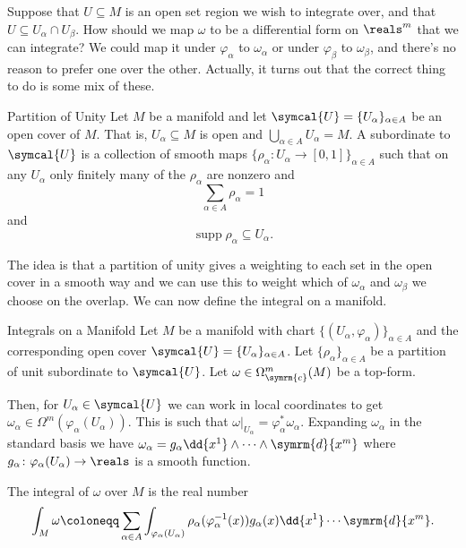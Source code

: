 \documentclass[fleqn]{NotesClass}
\renewcommand{\dl}{\symrm{d}}
\newcommand{\compact}{\symrm{c}}
\newcommand{\openCover}{\symcal{U}}
\DeclareMathOperator{\supp}{supp}
\begin{document}
    Suppose that \(U \subseteq M\) is an open set region we wish to integrate over, and that \(U \subseteq U_\alpha \cap U_\beta\).
    How should we map \(\omega\) to be a differential form on \(\reals^m\) that we can integrate?
    We could map it under \(\varphi_\alpha\) to \(\omega_\alpha\) or under \(\varphi_\beta\) to \(\omega_\beta\), and there's no reason to prefer one over the other.
    Actually, it turns out that the correct thing to do is some mix of these.
    
    \begin{dfn}{Partition of Unity}{}
        Let \(M\) be a manifold and let \(\openCover = \{U_\alpha\}_{\alpha \in A}\) be an open cover of \(M\).
        That is, \(U_\alpha \subseteq M\) is open and \(\bigcup_{\alpha \in A} U_\alpha = M\).
        A  subordinate to \(\openCover\) is a collection of smooth maps \(\{\rho_\alpha \colon U_\alpha \to [0, 1]\}_{\alpha \in A}\) such that on any \(U_\alpha\) only finitely many of the \(\rho_\alpha\) are nonzero and
        \begin{equation}
            \sum_{\alpha \in A} \rho_\alpha = 1
        \end{equation}
        and
        \begin{equation}
            \supp \rho_\alpha \subseteq U_\alpha.
        \end{equation}
    \end{dfn}
    
    The idea is that a partition of unity gives a weighting to each set in the open cover in a smooth way and we can use this to weight which of \(\omega_\alpha\) and \(\omega_\beta\) we choose on the overlap.
    We can now define the integral on a manifold.
    
    \begin{dfn}{Integrals on a Manifold}{}
        Let \(M\) be a manifold with chart \(\{(U_\alpha, \varphi_\alpha)\}_{\alpha \in A}\) and the corresponding open cover \(\openCover = \{U_\alpha\}_{\alpha \in A}\).
        Let \(\{\rho_\alpha\}_{\alpha \in A}\) be a partition of unit subordinate to \(\openCover\).
        Let \(\omega \in \Omega_{\compact}^m(M)\) be a top-form.
        
        Then, for \(U_\alpha \in \openCover\) we can work in local coordinates to get \(\omega_\alpha \in \Omega^m(\varphi_\alpha(U_\alpha))\).
        This is such that \(\omega|_{U_\alpha} = \varphi_\alpha^*\omega_\alpha\).
        Expanding \(\omega_\alpha\) in the standard basis we have \(\omega_\alpha = g_\alpha \dd{x^1} \wedge \dotsb \wedge \dl{x^m}\) where \(g_\alpha \colon \varphi_\alpha(U_\alpha) \to \reals\) is a smooth function.
        
        The integral of \(\omega\) over \(M\) is the real number
        \begin{equation}
            \int_M \omega \coloneqq \sum_{\alpha \in A} \int_{\varphi_\alpha(U_\alpha)} \rho_\alpha(\varphi_\alpha^{-1}(x)) g_\alpha(x) \dd{x^1} \dotsb \dl{x^m}.
        \end{equation}
    \end{dfn}
    
\end{document}
